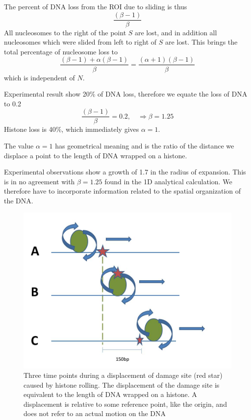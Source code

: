\documentclass[12pt]{report}
\begin{document}
   The percent of DNA loss from the ROI due to sliding is thus 
   \begin{equation}
   \frac{(\beta-1)}{\beta}
   \end{equation}
   All nucleosomes to the right of the point $S$ are lost, and in addition all nucleosomes which were slided from left to right of $S$ are lost. This brings the total percentage of nucleosome loss to 
   \begin{equation*}
   \frac{(\beta-1) +\alpha(\beta -1)}{\beta}= \frac{(\alpha+1)(\beta -1)}{\beta}
   \end{equation*}
   which is independent of $N$.
   
   Experimental result show 20\% of DNA loss, therefore we equate the loss of DNA to 0.2 
   \begin{equation*}
   \frac{(\beta -1)}{\beta}=0.2, \quad \Rightarrow \beta = 1.25
   \end{equation*}     
   Histone loss is 40\%, which immediately gives $\alpha =1$.
   
   The value $\alpha=1$ has geometrical meaning and is the ratio of the distance we displace a point to the length of DNA wrapped on a histone. 
   
   Experimental observations show a growth of 1.7 in the radius of expansion. This is in no agreement with $\beta=1.25$ found in the 1D analytical calculation. We therefore have to incorporate information related to the spatial organization of the DNA. 
   
   
   \begin{figure}
   	\centering
   	\includegraphics[width=0.7\linewidth]{Images/SlidingModel/histoneSlidingSingle}
   	\caption{{Three time points during a displacement of damage site (red star) caused by histone rolling. The displacement of the damage site is equivalent to the length of DNA wrapped on a histone. A displacement is relative to some reference point, like the origin, and does not refer to an actual motion on the DNA}}
   	\label{fig:histoneSlidingSingle}
   \end{figure}
   
\end{document}
